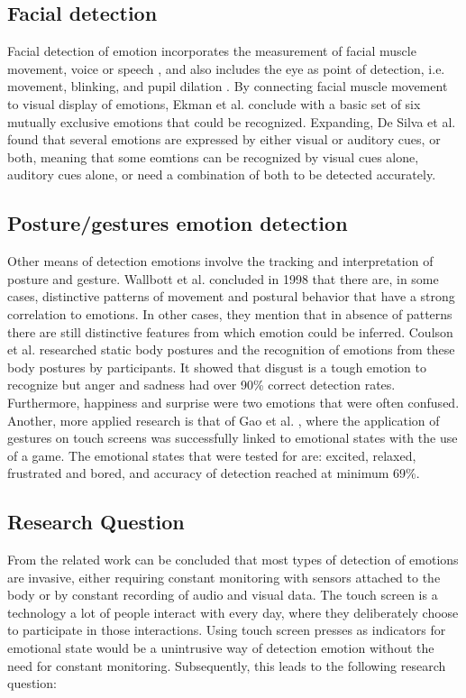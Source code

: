 \documentclass{sig-alternate}
\begin{document}
\subsection{Facial detection} %
\label{sub:facial_detection}
Facial detection of emotion incorporates the measurement of facial muscle movement, voice or speech \cite{Ververidis2004}, and also includes the eye as point of detection, i.e. movement, blinking, and pupil dilation \cite{Soleymani2015}. By connecting facial muscle movement to visual display of emotions, Ekman et al. \cite{Ekman1969} conclude with a basic set of six mutually exclusive emotions that could be recognized. Expanding, De Silva et al. \cite{Silva1997} found that several emotions are expressed by either visual or auditory cues, or both, meaning that some eomtions can be recognized by visual cues alone, auditory cues alone, or need a combination of both to be detected accurately.

\subsection{Posture/gestures emotion detection}
Other means of detection emotions involve the tracking and interpretation of posture and gesture. Wallbott et al. \cite{Wallbott1998} concluded in 1998 that there are, in some cases, distinctive patterns of movement and postural behavior that have a strong correlation to emotions. In other cases, they mention that in absence of patterns there are still distinctive features from which emotion could be inferred. Coulson et al. \cite{Coulson2004} researched static body postures and the recognition of emotions from these body postures by participants. It showed that disgust is a tough emotion to recognize but anger and sadness had over 90\% correct detection rates. Furthermore, happiness and surprise were two emotions that were often confused. Another, more applied research is that of Gao et al. \cite{Gao2012}, where the application of gestures on touch screens was successfully linked to emotional states with the use of a game. The emotional states that were tested for are: excited, relaxed, frustrated and bored, and accuracy of detection reached at minimum 69\%. 

\subsection{Research Question}
From the related work can be concluded that most types of detection of emotions are invasive, either requiring constant monitoring with sensors attached to the body or by constant recording of audio and visual data. The touch screen is a technology a lot of people interact with every day, where they deliberately choose to participate in those interactions. Using touch screen presses as indicators for emotional state would be a unintrusive way of detection emotion without the need for constant monitoring. Subsequently, this leads to the following research question:\\
\end{document}
